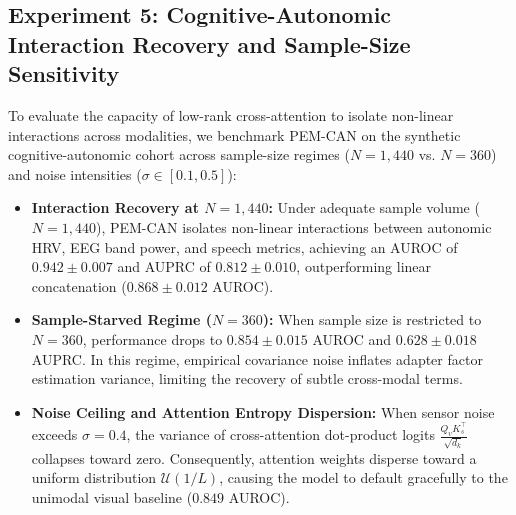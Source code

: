 \documentclass[journal,10pt,twocolumn]{IEEEtran}
\begin{document}
\begin{table}[!h]
\centering
\caption{Experiment 4: Component Ablation Study on Held-Out Test Cohort.}
\label{tab:exp3_ablation}
\end{table}

\subsection{Experiment 5: Cognitive-Autonomic Interaction Recovery and Sample-Size Sensitivity}
\label{sec:exp5_cognitive}
To evaluate the capacity of low-rank cross-attention to isolate non-linear interactions across modalities, we benchmark PEM-CAN on the synthetic cognitive-autonomic cohort across sample-size regimes ($N=1{,}440$ vs. $N=360$) and noise intensities ($\sigma \in [0.1, 0.5]$):
\begin{itemize}
    \item \textbf{Interaction Recovery at $N=1{,}440$:} Under adequate sample volume ($N=1{,}440$), PEM-CAN isolates non-linear interactions between autonomic HRV, EEG band power, and speech metrics, achieving an AUROC of $0.942 \pm 0.007$ and AUPRC of $0.812 \pm 0.010$, outperforming linear concatenation ($0.868 \pm 0.012$ AUROC).
    \item \textbf{Sample-Starved Regime ($N=360$):} When sample size is restricted to $N=360$, performance drops to $0.854 \pm 0.015$ AUROC and $0.628 \pm 0.018$ AUPRC. In this regime, empirical covariance noise inflates adapter factor estimation variance, limiting the recovery of subtle cross-modal terms.
    \item \textbf{Noise Ceiling and Attention Entropy Dispersion:} When sensor noise exceeds $\sigma = 0.4$, the variance of cross-attention dot-product logits $\frac{Q_v K_s^\top}{\sqrt{d_k}}$ collapses toward zero. Consequently, attention weights disperse toward a uniform distribution $\mathcal{U}(1/L)$, causing the model to default gracefully to the unimodal visual baseline ($0.849$ AUROC).
\end{itemize}
\end{document}
